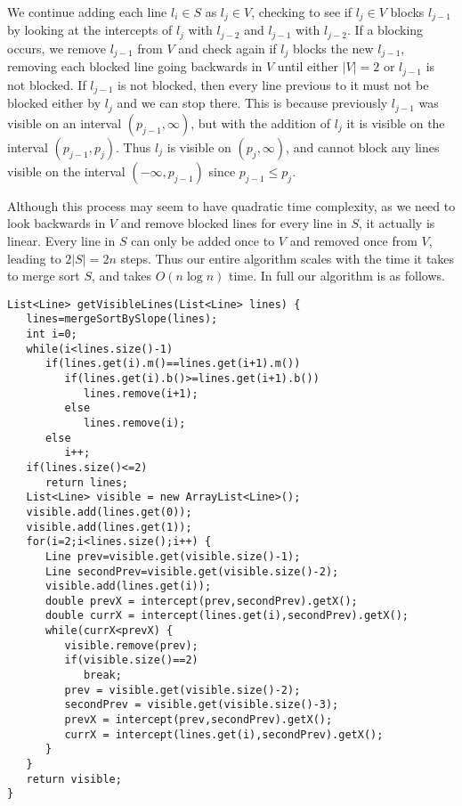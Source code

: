 \documentclass[12pt]{article}
\begin{document}
We continue adding each line \(l_i\in S\) as \(l_j\in V\), checking to see if \(l_j\in V\) blocks \(l_{j-1}\) by looking at the intercepts
of \(l_j\) with \(l_{j-2}\) and \(l_{j-1}\) with \(l_{j-2}\). If a blocking occurs, we remove \(l_{j-1}\) from \(V\) and check again if \(l_j\) blocks
the new \(l_{j-1}\), removing each blocked line going backwards in \(V\) until either \(|V|=2\) or \(l_{j-1}\) is not blocked. If \(l_{j-1}\) is not blocked,
then every line previous to it must not be blocked either by \(l_j\) and we can stop there. This is because previously \(l_{j-1}\) was visible on
an interval \((p_{j-1},\infty)\), but with the addition of \(l_j\) it is visible on the interval \((p_{j-1},p_j)\). Thus \(l_j\) is visible on \((p_j,\infty)\),
and cannot block any lines visible on the interval \((-\infty,p_{j-1})\) since \(p_{j-1}\leq p_j\).

Although this process may seem to have quadratic time complexity, as we need to look backwards in \(V\) and remove blocked lines for every line in \(S\), it actually
is linear. Every line in \(S\) can only be added once to \(V\) and removed once from \(V\), leading to \(2|S|=2n\) steps. Thus our entire algorithm scales with the
time it takes to merge sort \(S\), and takes \(O(n\log n)\) time. In full our algorithm is as follows.

\begin{verbatim}
List<Line> getVisibleLines(List<Line> lines) {
   lines=mergeSortBySlope(lines);
   int i=0;
   while(i<lines.size()-1)
      if(lines.get(i).m()==lines.get(i+1).m())
         if(lines.get(i).b()>=lines.get(i+1).b())
            lines.remove(i+1);
         else
            lines.remove(i);
      else
         i++;
   if(lines.size()<=2)
      return lines;
   List<Line> visible = new ArrayList<Line>();
   visible.add(lines.get(0));
   visible.add(lines.get(1));
   for(i=2;i<lines.size();i++) {
      Line prev=visible.get(visible.size()-1);
      Line secondPrev=visible.get(visible.size()-2);
      visible.add(lines.get(i));
      double prevX = intercept(prev,secondPrev).getX();
      double currX = intercept(lines.get(i),secondPrev).getX();
      while(currX<prevX) {
         visible.remove(prev);
         if(visible.size()==2)
            break;
         prev = visible.get(visible.size()-2);
         secondPrev = visible.get(visible.size()-3);
         prevX = intercept(prev,secondPrev).getX();
         currX = intercept(lines.get(i),secondPrev).getX();
      }
   }
   return visible;
}
\end{verbatim}

\pagebreak
\end{document}
